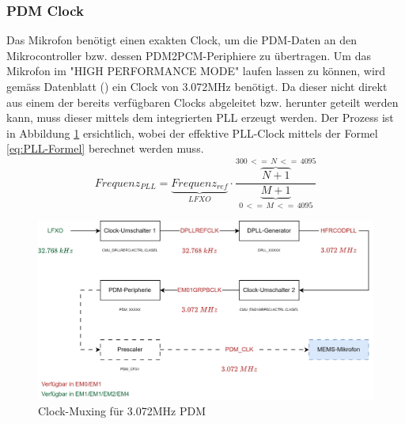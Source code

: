 \documentclass[12pt]{article}
\begin{document}
	\subsubsection*{PDM Clock}
	Das Mikrofon benötigt einen exakten Clock, um die PDM-Daten an den Mikrocontroller bzw. dessen PDM2PCM-Periphiere zu übertragen. Um das Mikrofon im "HIGH PERFORMANCE MODE" laufen lassen zu können, wird gemäss Datenblatt (\cite{noauthor_httpsinvensensetdkcomwp-contentuploads202007ds-000157-ics-41351-v14pdf_nodate}) ein Clock von 3.072MHz benötigt. Da dieser nicht direkt aus einem der bereits verfügbaren Clocks abgeleitet bzw. herunter geteilt werden kann, muss dieser mittels dem integrierten PLL erzeugt werden. Der Prozess ist in Abbildung \ref{fig:batclock-muxing-pdm} ersichtlich, wobei der effektive PLL-Clock mittels der Formel \ref{eq:PLL-Formel} berechnet werden muss.
	\begin{equation}\label{eq:PLL-Formel}
		Frequenz_{PLL} = \underbrace{Frequenz_{ref}}_{LFXO} \cdot \frac{\overbrace{N+1}^{300\,<=\, N \, <= \, 4095}}{\underbrace{M+1}_{0\,<=\,M\,<=\,4095}}
	\end{equation}
	\begin{figure}[H]
		\centering
		\includegraphics[width=1\linewidth]{images/BAT_Clock-Muxing-PDM}
		\caption{Clock-Muxing für 3.072MHz PDM}
		\label{fig:batclock-muxing-pdm}
	\end{figure}
\end{document}
